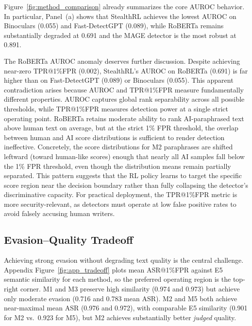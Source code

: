 \documentclass[11pt]{article}
\begin{document}
Figure~\ref{fig:method_comparison} already summarizes the core AUROC behavior. In particular, Panel~(a) shows that StealthRL achieves the lowest AUROC on Binoculars (0.055) and Fast-DetectGPT (0.089), while RoBERTa remains substantially degraded at 0.691 and the MAGE detector is the most robust at 0.891.

The RoBERTa AUROC anomaly deserves further discussion. Despite achieving near-zero TPR@1\%FPR (0.002), StealthRL's AUROC on RoBERTa (0.691) is far higher than on Fast-DetectGPT (0.089) or Binoculars (0.055). This apparent contradiction arises because AUROC and TPR@1\%FPR measure fundamentally different properties. AUROC captures global rank separability across all possible thresholds, while TPR@1\%FPR measures detection power at a single strict operating point. RoBERTa retains moderate ability to rank AI-paraphrased text above human text on average, but at the strict 1\% FPR threshold, the overlap between human and AI score distributions is sufficient to render detection ineffective. Concretely, the score distributions for M2 paraphrases are shifted leftward (toward human-like scores) enough that nearly all AI samples fall below the 1\% FPR threshold, even though the distribution means remain partially separated. This pattern suggests that the RL policy learns to target the specific score region near the decision boundary rather than fully collapsing the detector's discriminative capacity. For practical deployment, the TPR@1\%FPR metric is more security-relevant, as detectors must operate at low false positive rates to avoid falsely accusing human writers.

\subsection{Evasion--Quality Tradeoff}

Achieving strong evasion without degrading text quality is the central challenge. Appendix Figure~\ref{fig:app_tradeoff} plots mean ASR@1\%FPR against E5 semantic similarity for each method, so the preferred operating region is the top-right corner. M1 and M3 preserve high similarity (0.974 and 0.973) but achieve only moderate evasion (0.716 and 0.783 mean ASR). M2 and M5 both achieve near-maximal mean ASR (0.976 and 0.972), with comparable E5 similarity (0.901 for M2 vs.\ 0.923 for M5), but M2 achieves substantially better \emph{judged} quality.
\end{document}
